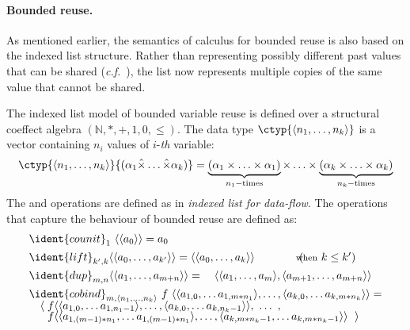 \paragraph{Bounded reuse.}
As mentioned earlier, the semantics of calculus for bounded reuse is also based on the indexed list 
structure. Rather than representing possibly different past values that can be shared (\emph{c.f.}~), 
the list now represents multiple copies of the same value that cannot be shared.

\begin{example}
The indexed list model of bounded variable reuse is defined over a structural coeffect
algebra $(\mathbb{N}, \ast, +, 1, 0, \leq)$. The data type $\ctyp{\langle n_1, \ldots, n_k\rangle}$ 
is a vector containing $n_i$ values of $i$-\textit{th} variable:
%
\begin{equation*}
\ctyp{\langle n_1, \ldots, n_k\rangle}{(\alpha_1 \xtimes \ldots \xtimes \alpha_k)} = 
\underbrace{(\alpha_1 \times \ldots \times \alpha_1)}_{n_1-\textnormal{times}} \times \ldots \times
  \underbrace{(\alpha_k \times \ldots \times \alpha_k)}_{n_k-\textnormal{times}}
\end{equation*}
%
The  and  operations are defined as in \emph{indexed list for data-flow}.
The operations that capture the behaviour of bounded reuse are defined as:
%
\begin{equation*}
\begin{array}{l}
\ident{counit}_{1}~\langle \langle a_0 \rangle \rangle = a_0
\\[0.45em]
\ident{lift}_{k', k} \langle\langle a_0, \ldots, a_{k'} \rangle\rangle = 
  \langle\langle a_0, \ldots, a_k \rangle\rangle \qquad\qquad(\hspace{-0.95em}\textnormal{\footnotesize when}~k\leq k')
\\[0.45em]
\ident{dup}_{m, n} \langle \langle a_1, \ldots, a_{m+n} \rangle \rangle = 
\quad \langle \langle a_1, \ldots, a_m \rangle, \langle a_{m+1}, \ldots, a_{m+n} \rangle \rangle
\\[0.45em]
\ident{cobind}_{m, \langle n_1, \ldots, n_k \rangle}~f~
  \langle \langle a_{1,0}, \ldots a_{1,m\ast{n_1}} \rangle, \ldots, \langle a_{k,0}, \ldots a_{k,m\ast{n_k}} \rangle \rangle = \\[-0.25em]
\quad \langle\; f \langle \langle a_{1,0}, \ldots a_{1,{n_1 - 1}} \rangle, \ldots, \langle a_{k,0}, \ldots a_{k,{n_k - 1}} \rangle \rangle, ~\ldots~, \\[-0.25em]
\quad ~~ f \langle \langle a_{1,(m-1)\ast n_1}, \ldots a_{1,(m-1) \ast n_1} \rangle, \ldots, 
                   \langle a_{k,m\ast n_k - 1}, \ldots a_{k,m\ast n_k - 1} \rangle \rangle~\; \rangle
\end{array}
\end{equation*}
\end{example}


